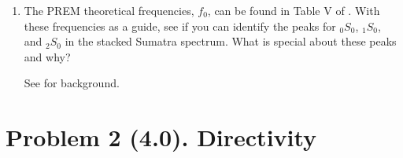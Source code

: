 \documentclass[11pt,titlepage,fleqn]{article}
\begin{document}
\begin{enumerate}
\item  The PREM theoretical frequencies, $f_0$, can be found in Table V of \citet{PREM}. With these frequencies as a guide, see if you can identify the peaks for $_0S_0$, $_1S_0$, and $_2S_0$ in the stacked Sumatra spectrum. What is special about these peaks and why?


See \citet[][p. 106]{SteinWysession} for background.

\end{enumerate}


\section*{Problem 2 (4.0). Directivity}
\end{document}
